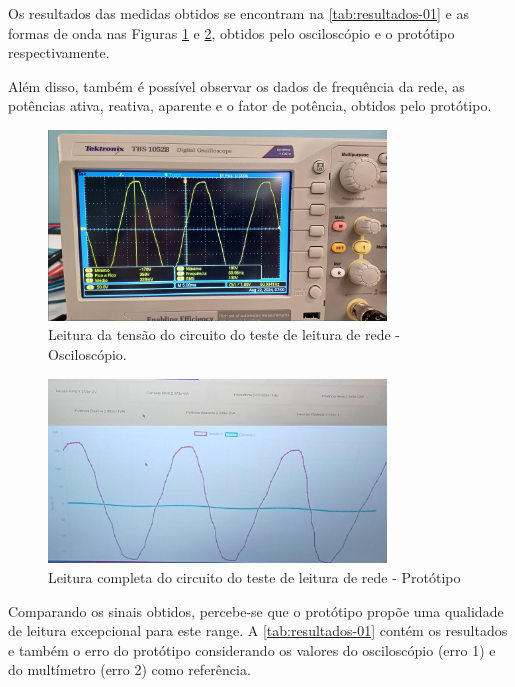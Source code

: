 Os resultados das medidas obtidos se encontram na \autoref{tab:resultados-01} e as formas de onda nas Figuras \ref{fig:leitura-rede-osc} e \ref{fig:leitura-rede-boy-ondas}, obtidos pelo osciloscópio e o protótipo respectivamente. 

Além disso, também é possível observar os dados de frequência da rede, as potências ativa, reativa, aparente e o fator de potência, obtidos pelo protótipo.

\begin{figure}[htb!]
    \caption{Leitura da tensão do circuito do teste de leitura de rede - Osciloscópio.}
    \label{fig:leitura-rede-osc}
    \includegraphics[width=0.8\textwidth]{figuras/leitura-rede-osc.png}
    \fonte{}
\end{figure}

\begin{figure}[htb!]
    \caption{Leitura completa do circuito do teste de leitura de rede - Protótipo}
    \label{fig:leitura-rede-boy-ondas}
    \includegraphics[width=0.8\textwidth]{figuras/leitura-rede-boy-ondas.png}
    \fonte{}
\end{figure}

Comparando os sinais obtidos, percebe-se que o protótipo propõe uma qualidade de leitura excepcional para este range. A \autoref{tab:resultados-01} contém os resultados e também o erro do protótipo considerando os valores do osciloscópio (erro 1) e do multímetro (erro 2) como referência.

